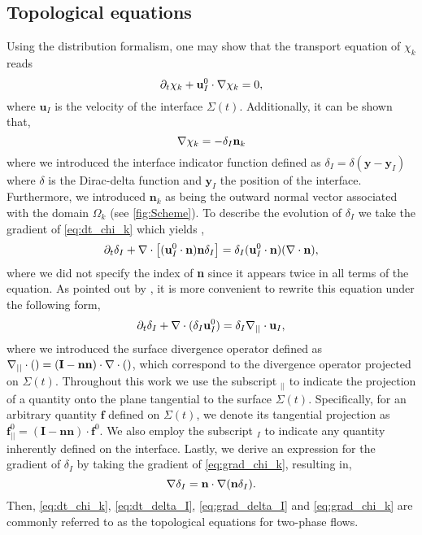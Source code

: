 \subsection{Topological equations}

Using the distribution formalism, one may show that the transport equation of $\chi_k$ reads\citep{drew1983mathematical} 
\begin{equation}
    \partial_t \chi_k
    + \textbf{u}_I^0 \cdot \mathbf{\nabla} \chi_k
    = 0,
    \label{eq:dt_chi_k}
\end{equation}
where $\textbf{u}_I$ is the velocity of the interface $\Sigma(t)$.
Additionally, it can be shown  \citep{drew1983mathematical} that,
\begin{equation}
    \mathbf{\nabla} \chi_k
    = - \delta_I \textbf{n}_k
    \label{eq:grad_chi_k}
\end{equation}
where we introduced the interface indicator function defined as $\delta_I = \delta(\textbf{y}-\textbf{y}_I)$ where $\delta$ is the Dirac-delta function and $\textbf{y}_I$ the position of the interface. 
Furthermore, we introduced $\textbf{n}_k$ as being the outward normal vector associated with the domain $\Omega_k$ (see \ref{fig:Scheme}).
To describe the evolution of $\delta_I$ we take the gradient of \ref{eq:dt_chi_k} which yields \citep{morel2015mathematical},
\begin{equation}
    \partial_t \delta_I
    + \mathbf{\nabla}\cdot \left[(\textbf{u}_I^0\cdot\textbf{n})\textbf{n} \delta_I\right]
    = \delta_I (\textbf{u}_I^0\cdot\textbf{n})(\mathbf{\nabla}\cdot\textbf{n}),
\end{equation}
where we did not specify the index of \textbf{n} since it appears twice in all terms of the equation. 
As pointed out by \citet{morel2007surface}, it is more convenient to rewrite this equation under the following form,
\begin{equation}
    \partial_t \delta_I
    + \mathbf{\nabla}\cdot (\delta_I \textbf{u}_I^0)
    = \delta_I \mathbf{\nabla}_{||}\cdot \textbf{u}_I,
    \label{eq:dt_delta_I}
\end{equation}
where we introduced the surface divergence operator defined as $\mathbf{\nabla}_{||}\cdot ()= (\textbf{I}-\textbf{nn})\cdot \mathbf{\nabla}\cdot ()$, which correspond to the divergence operator projected on $\Sigma(t)$. 
Throughout this work we use the subscript  $_{||}$ to indicate the projection of a quantity onto the plane tangential to the surface $\Sigma(t)$. 
Specifically, for an arbitrary quantity $\textbf{f}$ defined on $\Sigma(t)$, we denote its tangential projection as $\textbf{f}_{||}^0 = (\textbf{I}-\textbf{nn})\cdot \textbf{f}^0$. 
We also employ the subscript $_I$ to indicate any quantity inherently defined on the interface. 
Lastly, we derive an expression for the gradient of $\delta_I$ by taking the gradient of \ref{eq:grad_chi_k}, resulting in,
\begin{equation}
    \mathbf{\nabla}\delta_I 
    = \textbf{n} \cdot \mathbf{\nabla} (\textbf{n} \delta_I).
    \label{eq:grad_delta_I}
\end{equation}
Then, \ref{eq:dt_chi_k}, \ref{eq:dt_delta_I}, \ref{eq:grad_delta_I} and \ref{eq:grad_chi_k} are commonly referred to as the topological equations for two-phase flows.


